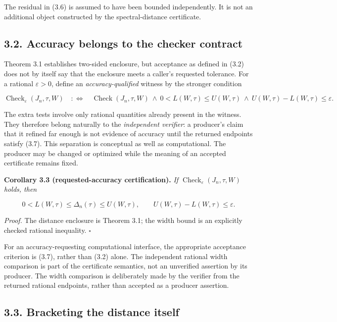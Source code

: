 \documentclass[
  11pt,
]{article}
\begin{document}
The residual in (3.6) is assumed to have been bounded independently. It
is not an additional object constructed by the spectral-distance
certificate.

\subsection{3.2. Accuracy belongs to the checker
contract}\label{accuracy-belongs-to-the-checker-contract}

Theorem 3.1 establishes two-sided enclosure, but acceptance as defined
in (3.2) does not by itself say that the enclosure meets a caller's
requested tolerance. For a rational \(\varepsilon>0\), define an
\emph{accuracy-qualified} witness by the stronger condition

\[
\operatorname{Check}_{\varepsilon}(J_n,\tau,W)
\quad:\Longleftrightarrow\quad
\operatorname{Check}(J_n,\tau,W)
\ \wedge\ 0<L(W,\tau)\le U(W,\tau)
\ \wedge\ U(W,\tau)-L(W,\tau)\le\varepsilon.
\tag{3.7}
\]

The extra tests involve only rational quantities already present in the
witness. They therefore belong naturally to the \emph{independent
verifier}: a producer's claim that it refined far enough is not evidence
of accuracy until the returned endpoints satisfy (3.7). This separation
is conceptual as well as computational. The producer may be changed or
optimized while the meaning of an accepted certificate remains fixed.

\textbf{Corollary 3.3 (requested-accuracy certification).} \emph{If
\(\operatorname{Check}_{\varepsilon}(J_n,\tau,W)\) holds, then}

\[
0<L(W,\tau)\le\Delta_n(\tau)\le U(W,\tau),
\qquad U(W,\tau)-L(W,\tau)\le\varepsilon.
\tag{3.8}
\]

\emph{Proof.} The distance enclosure is Theorem 3.1; the width bound is
an explicitly checked rational inequality. \(\square\)

For an accuracy-requesting computational interface, the appropriate
acceptance criterion is (3.7), rather than (3.2) alone. The independent
rational width comparison is part of the certificate semantics, not an
unverified assertion by its producer. The width comparison is
deliberately made by the verifier from the returned rational endpoints,
rather than accepted as a producer assertion.

\subsection{3.3. Bracketing the distance
itself}\label{bracketing-the-distance-itself}
\end{document}
